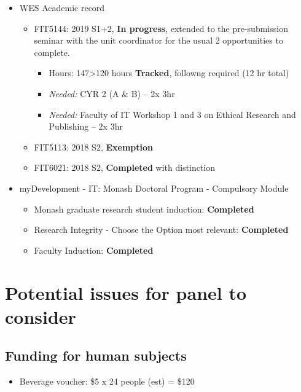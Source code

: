 \documentclass[11,]{article}
\providecommand{\tightlist}{%
  \setlength{\itemsep}{0pt}\setlength{\parskip}{0pt}}
\theoremstyle{definition}
\theoremstyle{definition}
\theoremstyle{definition}
\theoremstyle{remark}
\begin{document}
\begin{itemize}
\tightlist
\item
  WES Academic record

  \begin{itemize}
  \tightlist
  \item
    FIT5144: 2019 S1+2, \textbf{In progress}, extended to the
    pre-submission seminar with the unit coordinator for the usual 2
    opportunities to complete.

    \begin{itemize}
    \tightlist
    \item
      Hours: 147\textgreater{}120 hours \textbf{Tracked}, followng
      required (12 hr total)
    \item
      \emph{Needed:} CYR 2 (A \& B) -- 2x 3hr
    \item
      \emph{Needed:} Faculty of IT Workshop 1 and 3 on Ethical Research
      and Publishing -- 2x 3hr
    \end{itemize}
  \item
    FIT5113: 2018 S2, \textbf{Exemption} 
  \item
    FIT6021: 2018 S2, \textbf{Completed} with distinction
  \end{itemize}
\item
  myDevelopment - IT: Monash Doctoral Program - Compulsory Module

  \begin{itemize}
  \tightlist
  \item
    Monash graduate research student induction: \textbf{Completed} 
  \item
    Research Integrity - Choose the Option most relevant:
    \textbf{Completed} 
  \item
    Faculty Induction: \textbf{Completed} 
  \end{itemize}
\end{itemize}

\section{Potential issues for panel to
consider}\label{potential-issues-for-panel-to-consider}

\subsection{Funding for human
subjects}\label{funding-for-human-subjects}

\begin{itemize}
\tightlist
\item
  Beverage voucher: \$5 x 24 people (est) = \$120
\end{itemize}
\end{document}
